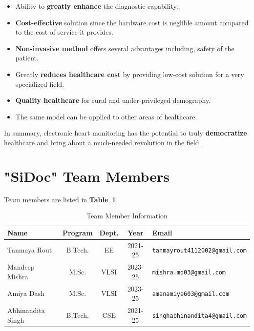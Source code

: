 \documentclass[12pt]{article}
\begin{document}
\begin{itemize}
    \item Ability to \textbf{greatly enhance} the diagnostic capability. 
    \item \textbf{Cost-effective} solution since the hardware cost is neglible amount compared to the cost of service it provides.
    \item \textbf{Non-invasive method} offers several advantages including, safety of the patient.
    \item Greatly \textbf{reduces healthcare cost} by providing low-cost solution for a very specialized field.
    \item \textbf{Quality healthcare} for rural and under-privileged demography.
    \item The same model can be applied to other areas of healthcare.
\end{itemize}

In summary, electronic heart monitoring has the potential to truly \textbf{democratize} healthcare and bring about a much-needed revolution in the field.



\section{"SiDoc" Team Members}
Team members are listed in \textbf{Table~\ref{tab:student_info}}.

\begin{table}[!htbp]
    \centering
    \begin{tabular}{|l|c|c|c|l|}
        \hline
        \textbf{Name} & \textbf{Program} & \textbf{Dept.} & \textbf{Year} & \textbf{Email} \\ \hline\hline
        Tanmaya Rout & B.Tech. & EE & 2021-25 & \texttt{tanmayrout4112002@gmail.com}\\ \hline
        Mandeep Mishra & M.Sc. & VLSI & 2023-25 & \texttt{mishra.md03@gmail.com}\\ \hline
        Amiya Dash & M.Sc. & VLSI & 2023-25 & \texttt{amanamiya603@gmail.com}\\ \hline
        Abhinandita Singh & B.Tech. & CSE & 2021-25 & \texttt{singhabhinandita4@gmail.com}\\ \hline
    \end{tabular}
    \caption{Team Member Information}
    \label{tab:student_info}
\end{table}
\end{document}

